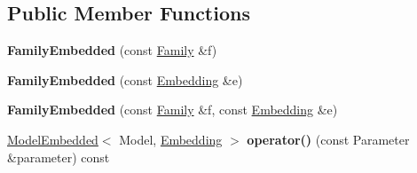 \subsection*{Public Member Functions}
\begin{DoxyCompactItemize}
\item 
\hypertarget{struct_d_r_d_s_p_1_1_family_embedded_aadd6f4c96abc07473c3d3a2af67da8e2}{{\bfseries Family\-Embedded} (const \hyperlink{struct_d_r_d_s_p_1_1_family}{Family} \&f)}\label{struct_d_r_d_s_p_1_1_family_embedded_aadd6f4c96abc07473c3d3a2af67da8e2}

\item 
\hypertarget{struct_d_r_d_s_p_1_1_family_embedded_a5f35240305420f366ebc2c1df7138d41}{{\bfseries Family\-Embedded} (const \hyperlink{struct_d_r_d_s_p_1_1_embedding}{Embedding} \&e)}\label{struct_d_r_d_s_p_1_1_family_embedded_a5f35240305420f366ebc2c1df7138d41}

\item 
\hypertarget{struct_d_r_d_s_p_1_1_family_embedded_a38fda518d650ea1b060ac0b20e113d1a}{{\bfseries Family\-Embedded} (const \hyperlink{struct_d_r_d_s_p_1_1_family}{Family} \&f, const \hyperlink{struct_d_r_d_s_p_1_1_embedding}{Embedding} \&e)}\label{struct_d_r_d_s_p_1_1_family_embedded_a38fda518d650ea1b060ac0b20e113d1a}

\item 
\hypertarget{struct_d_r_d_s_p_1_1_family_embedded_ac0c7a2fde0af6aa98f259b46f2be875d}{\hyperlink{struct_d_r_d_s_p_1_1_model_embedded}{Model\-Embedded}$<$ Model, \hyperlink{struct_d_r_d_s_p_1_1_embedding}{Embedding} $>$ {\bfseries operator()} (const Parameter \&parameter) const }\label{struct_d_r_d_s_p_1_1_family_embedded_ac0c7a2fde0af6aa98f259b46f2be875d}

\end{DoxyCompactItemize}
